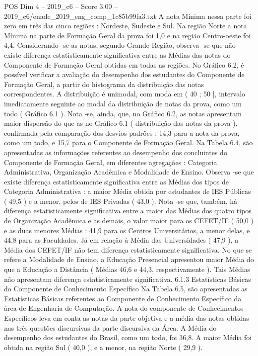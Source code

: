 \begin{textsample}{POS Dim 4 – 2019\_c6 – Score 3.00 – 2019\_c6/enade\_2019\_eng\_comp\_1c85b99fa3.txt}
A nota Mínima nessa parte foi zero em três das cinco regiões : Nordeste, Sudeste e Sul.
Na região Norte a nota Mínima na parte de Formação Geral da prova foi 1,0 e na região Centro-oeste foi 4,4.
Considerando -se as notas, segundo Grande Região, observa -se que não existe diferença estatisticamente significativa entre as Médias das notas do Componente de Formação Geral obtidas em todas as regiões.
No Gráfico 6.2, é possível verificar a avaliação do desempenho dos estudantes do Componente de Formação Geral, a partir do histograma da distribuição das notas correspondentes.
A distribuição é unimodal, com moda em ( 40 ; 50 ], intervalo imediatamente seguinte ao modal da distribuição de notas da prova, como um todo ( Gráfico 6.1 ).
Nota -se, ainda, que, no Gráfico 6.2, as notas apresentam maior dispersão do que as no Gráfico 6.1 ( distribuição das notas da prova ), confirmada pela comparação dos desvios padrões : 14,3 para a nota da prova, como um todo, e 15,7 para o Componente de Formação Geral.
Na Tabela 6.4, são apresentadas as informações referentes ao desempenho dos concluintes do Componente de Formação Geral, em diferentes agregações : Categoria Administrativa, Organização Acadêmica e Modalidade de Ensino.
Observa -se que existe diferença estatisticamente significativa entre as Médias dos tipos de Categoria Administrativa : a maior Média obtida por estudantes de IES Públicas ( 49,5 ) e a menor, pelos de IES Privadas ( 43,0 ).
Nota -se que, também, há diferença estatisticamente significativa entre a maior das Médias dos quatro tipos de Organização Acadêmica e as demais, o valor maior para os CEFET/IF ( 50,0 ) e as duas menores Médias : 41,9 para os Centros Universitários, a menor delas, e 44,8 para as Faculdades.
Já em relação à Média das Universidades ( 47,9 ), a Média dos CEFET/IF não tem diferença estatisticamente significativa.
No que se refere a Modalidade de Ensino, a Educação Presencial apresentou maior Média do que a Educação a Distância ( Médias 46,6 e 44,3, respectivamente ).
Tais Médias não apresentam diferença estatisticamente significativa. 6.1.3 Estatísticas Básicas do Componente de Conhecimento Específico Na Tabela 6.5, são apresentadas as Estatísticas Básicas referentes ao Componente de Conhecimento Específico da área de Engenharia de Computação.
A nota do componente de Conhecimentos Específicos leva em conta as notas da parte objetiva e a média das notas obtidas nas três questões discursivas da parte discursiva da Área.
A Média do desempenho dos estudantes do Brasil, como um todo, foi 36,8.
A maior Média foi obtida na região Sul ( 40,0 ), e a menor, na região Norte ( 29,9 ).

\end{textsample}
